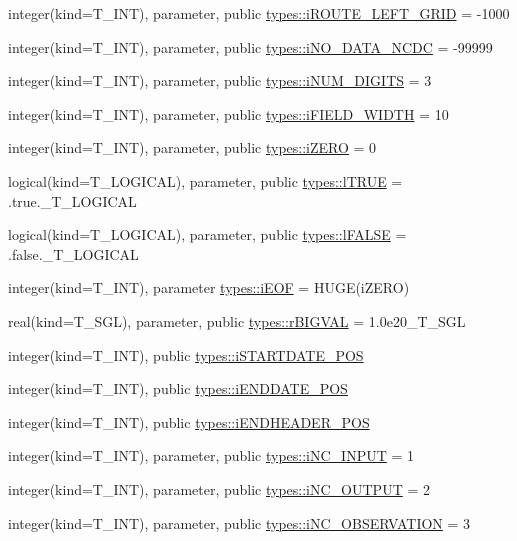 \begin{DoxyCompactItemize}
\item 
integer(kind=T\_\-INT), parameter, public \hyperlink{namespacetypes_ae4af15bc0a450716e8e45f1d550e1401}{types::iROUTE\_\-LEFT\_\-GRID} = -\/1000
\item 
integer(kind=T\_\-INT), parameter, public \hyperlink{namespacetypes_ad9741d8d6e8a33ba13e4b3f00c94d5fa}{types::iNO\_\-DATA\_\-NCDC} = -\/99999
\item 
integer(kind=T\_\-INT), parameter, public \hyperlink{namespacetypes_a4255711de8681fefcdb67943aa2d812f}{types::iNUM\_\-DIGITS} = 3
\item 
integer(kind=T\_\-INT), parameter, public \hyperlink{namespacetypes_ac00fb4e6602e3f1826af08a6bd5bc4e7}{types::iFIELD\_\-WIDTH} = 10
\item 
integer(kind=T\_\-INT), parameter, public \hyperlink{namespacetypes_a694f00629aa7084d30ef27a0f233de5a}{types::iZERO} = 0
\item 
logical(kind=T\_\-LOGICAL), parameter, public \hyperlink{namespacetypes_a440f71bd0dd529ae3aaa8309171baa67}{types::lTRUE} = .true.\_\-T\_\-LOGICAL
\item 
logical(kind=T\_\-LOGICAL), parameter, public \hyperlink{namespacetypes_ad09a27b431e0fad201524039e6943e5b}{types::lFALSE} = .false.\_\-T\_\-LOGICAL
\item 
integer(kind=T\_\-INT), parameter \hyperlink{namespacetypes_ad760d56012336a0edb070999d519902f}{types::iEOF} = HUGE(iZERO)
\item 
real(kind=T\_\-SGL), parameter, public \hyperlink{namespacetypes_aa47fdce92f090579ada31ab06c3545ed}{types::rBIGVAL} = 1.0e20\_\-T\_\-SGL
\item 
integer(kind=T\_\-INT), public \hyperlink{namespacetypes_a95d527e2c66739a080d7d76bb1ae6b97}{types::iSTARTDATE\_\-POS}
\item 
integer(kind=T\_\-INT), public \hyperlink{namespacetypes_af25078a2a39ad338a062b8551e940824}{types::iENDDATE\_\-POS}
\item 
integer(kind=T\_\-INT), public \hyperlink{namespacetypes_a9ab0a4f51d8fd66826d7d3079ecfdbc4}{types::iENDHEADER\_\-POS}
\item 
integer(kind=T\_\-INT), parameter, public \hyperlink{namespacetypes_ae36ea9f0739802b729005e07be23b389}{types::iNC\_\-INPUT} = 1
\item 
integer(kind=T\_\-INT), parameter, public \hyperlink{namespacetypes_a830e5ccbb0e18b2ee9a748baf073a047}{types::iNC\_\-OUTPUT} = 2
\item 
integer(kind=T\_\-INT), parameter, public \hyperlink{namespacetypes_a9b12c2d37849090214258503062fc8d6}{types::iNC\_\-OBSERVATION} = 3

\end{DoxyCompactItemize}

